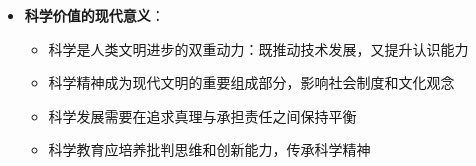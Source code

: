 \begin{center}
{{\begin{itemize}
\begin{itemize}
  \item \textbf{文明影响}：促进民主制度、教育理念、法律制度、社会治理的现代化
  \item \textbf{思维方式}：科学精神深刻影响人类的认识方法和价值观念
  \item \textbf{国际合作}：全球性科学合作促进人类命运共同体建设
  \item \textbf{伦理责任}：科学发展需要承担相应的社会责任和伦理考量
  \end{itemize}
\item \textbf{科学价值的现代意义}：
  \begin{itemize}
  \item 科学是人类文明进步的双重动力：既推动技术发展，又提升认识能力
  \item 科学精神成为现代文明的重要组成部分，影响社会制度和文化观念
  \item 科学发展需要在追求真理与承担责任之间保持平衡
  \item 科学教育应培养批判思维和创新能力，传承科学精神
  \end{itemize}
\end{itemize}
}}
\end{center}